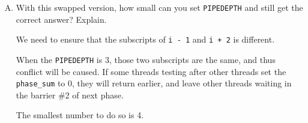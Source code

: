 \documentclass[11pt]{article}
\newenvironment{choice}{\begin{enumerate}[A.]}{\end{enumerate}}
\newenvironment{answer}{\begin{minipage}[c][1.5in]{\textwidth}}{\end{minipage}}
\begin{document}
\begin{choice}
\begin{answer}
When we do so, the threads might be different phase with each other when testing and setting to 0. 
Some threads are testing the previous phase of phase \lstinline{i}, while some are setting the next phase of phase \lstinline{i + 1} to zero. 
Namely, some threads are tesing phase \lstinline{i - 1}, while some are setting phase \lstinline{i + 2}. 

When the \lstinline{PIPEDEPTH} is 128, the subscripts of phase \lstinline{i - 1} and phase \lstinline{i + 2} are different, so there is no conflict. 
\end{answer}
\item
With this swapped version,
how small can you set \texttt{PIPEDEPTH} and still get the correct
answer?  Explain.

\begin{answer}
We need to ensure that the subscripts of \lstinline{i - 1} and \lstinline{i + 2} is different. 

When the \lstinline{PIPEDEPTH} is 3, those two subscripts are the same, and thus conflict will be caused. 
If some threads testing after other threads set the \lstinline{phase_sum} to 0, they will return earlier, and leave other threads waiting in the barrier \#2 of next phase. 

The smallest number to do so is 4. 

\end{answer}
\end{choice}
\end{document}
